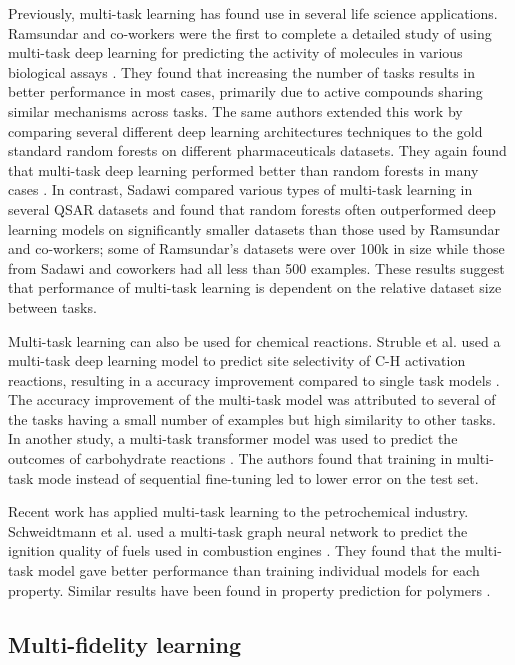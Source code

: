 Previously, multi-task learning has found use in several life science applications. Ramsundar and co-workers were the first to complete a detailed study of using multi-task deep learning for predicting the activity of molecules in various biological assays \cite{Ramsundar2015}. They found that increasing the number of tasks results in better performance in most cases, primarily due to active compounds sharing similar mechanisms across tasks. The same authors extended this work by comparing several different deep learning architectures techniques to the gold standard random forests on different pharmaceuticals datasets. They again found that multi-task deep learning performed better than random forests in many cases \cite{Ramsundar2017}. In contrast, Sadawi compared various types of multi-task learning in several QSAR datasets and found that random forests often outperformed deep learning models \cite{Sadawi2019} on significantly smaller datasets than those used by Ramsundar and co-workers; some of Ramsundar's datasets were over 100k in size while those from Sadawi and coworkers had all less than 500 examples. These results suggest that performance of multi-task learning is dependent on the relative dataset size between tasks.

Multi-task learning can also be used for chemical reactions. Struble et al. used a multi-task deep learning model to predict site selectivity of C-H activation reactions, resulting in a accuracy improvement compared to single task models \cite{Struble2020}. The accuracy improvement of the multi-task model was attributed to several of the tasks having a small number of examples but high similarity to other tasks. In another study, a multi-task transformer model was used to predict the outcomes of carbohydrate reactions \cite{Pesciullesi2020}. The authors found that training in multi-task mode instead of sequential fine-tuning led to lower error on the test set. 

Recent work has applied multi-task learning to the petrochemical industry. Schweidtmann et al. used a multi-task graph neural network to predict the ignition quality of fuels used in combustion engines \cite{Schweidtmann2020}. They found that the multi-task model gave better performance than training individual models for each property. Similar results have been found in property prediction for polymers \cite{Gurnani2023}.

\subsection{Multi-fidelity learning}

